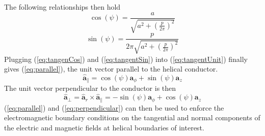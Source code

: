The following relationships then hold
\begin{equation}\label{eq:tangenCos}
	\cos(\psi) = \frac{a}{\sqrt{a^2 + \left(\frac{p}{2\pi}\right)^2}}
\end{equation}
\begin{equation}\label{eq:tangentSin}
	\sin(\psi) = \frac{p}{2\pi\sqrt{a^2 + \left(\frac{p}{2\pi}\right)^2}}
\end{equation}
Plugging (\ref{eq:tangenCos}) and (\ref{eq:tangentSin}) into (\ref{eq:tangentUnit}) finally gives (\ref{eq:parallel}), the unit vector parallel to the helical conductor. 
\begin{equation}\label{eq:parallel}
	\hat{\mathbf{a}}_{\parallel} =  \cos(\psi)\mathbf{a}_{\phi} 
	+ \sin(\psi)\mathbf{a}_{z}
\end{equation}
The unit vector perpendicular to the conductor is then
\begin{equation}\label{eq:perpendicular}
	\hat{\mathbf{a}}_{\perp} =  \hat{\mathbf{a}}_{r} \times \hat{\mathbf{a}}_{\parallel} = -\sin(\psi)\mathbf{a}_{\phi} + \cos(\psi)\mathbf{a}_{z}
\end{equation}
(\ref{eq:parallel}) and (\ref{eq:perpendicular}) can then be used to enforce the electromagnetic boundary conditions on the tangential and normal components of the electric and magnetic fields at helical boundaries of interest.